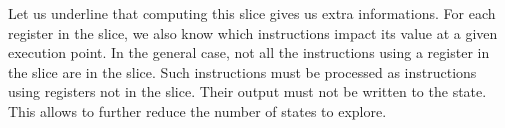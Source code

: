   Let us underline that computing this slice gives us extra informations. For
  each register in the slice, we also know which instructions impact its value
  at a given execution point. In the general case, not all the instructions
  using a register in the slice are in the slice. Such instructions must be
  processed as instructions using registers not in the slice. Their output must
  not be written to the state. This allows to further reduce the number of
  states to explore.
  
